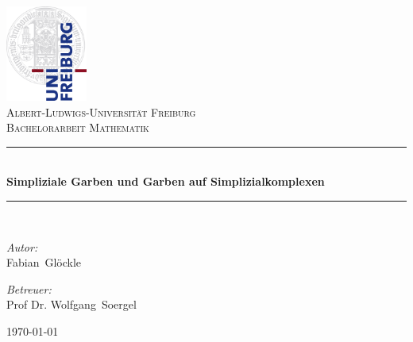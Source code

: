
\pagestyle{empty}

\begin{center}

\includegraphics[width=0.2\textwidth]{Uni_Logo-Grundversion_E1_A4_CMYK}\\[1cm]   

\textsc{\LARGE Albert-Ludwigs-Universität Freiburg}\\[1.5cm]

\textsc{\Large Bachelorarbeit Mathematik}\\
\vspace*{1.2cm}

\hrule\  \\[0.4cm]
{ \Large \bfseries 
Simpliziale Garben und Garben auf Simplizialkomplexen
}\\[0.4cm]

\hrule\  \\[1.5cm]

\begin{minipage}{0.49\textwidth}
\begin{flushleft} \large
\emph{Autor:}\\
Fabian~Glöckle
\end{flushleft}
\end{minipage}
\begin{minipage}{0.49\textwidth}
\begin{flushright} \large
\emph{Betreuer:} \\
Prof Dr. Wolfgang~Soergel
\end{flushright}
\end{minipage}

\vfill

{\large \today}

\end{center}

